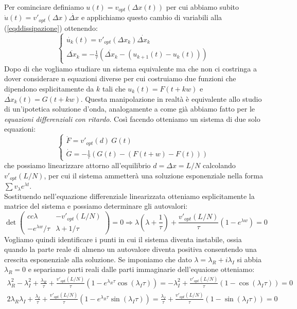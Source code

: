 Per cominciare definiamo $u(t)=v_{opt}(\Delta x(t))$ per cui abbiamo subito $\dot{u}(t)=v'_{opt}(\Delta x)\dot{\Delta x}$ e applichiamo questo cambio di variabili alla (\ref{eqddissipazione}) ottenendo:
\begin{equation}
	\begin{cases}
		\dot{u_k}(t)=v'_{opt}(\Delta x_k)\dot{\Delta x_k}\\
		\ddot{\Delta x_k}=-\frac{1}{\tau}(\dot{\Delta x_k}-(u_{k+1}(t)-u_k(t)))
	\end{cases}
\end{equation}
Dopo di che vogliamo studiare un sistema equivalente ma che non ci costringa a dover considerare n equazioni diverse per cui costruiamo due funzioni che dipendono esplicitamente da $k$ tali che $u_k(t)=F(t+kw)$ e $\dot{\Delta x_k}(t)=G(t+kw)$. Questa manipolazione in realtà è equivalente allo studio di un'ipotetica soluzione d'onda, analogamente a come già abbiamo fatto per le \textit{equazioni differenziali con ritardo}. Così facendo otteniamo un sistema di due solo equazioni:
\begin{equation}
	\begin{cases}
		\dot{F}=v'_{opt}(d)\ G(t)\\
		\dot{G}=-\frac{1}{\tau}(G(t)-(F(t+w)-F(t)))
		\label{fg}
	\end{cases}
\end{equation}
che possiamo linearizzare attorno all'equilibrio $d=\Delta x=L/N$ calcolando $v'_{opt}(L/N)$, per cui il sistema ammetterà una soluzione esponenziale nella forma $\sum v_\lambda e^{\lambda t}$.\\ Sostituendo nell'equazione differenziale linearizzata otteniamo esplicitamente la matrice del sistema e possiamo determinare gli autovalori:
\begin{equation*}
	\det \begin{pmatrix}{cc}
		\lambda & -v'_{opt}(L/N) \\
		-e^{\lambda w}/\tau & \lambda+1/\tau
	\end{pmatrix}=0
	\Rightarrow \lambda(\lambda+\frac{1}{\tau})+\frac{v'_{opt}(L/N)}{\tau}(1-e^{\lambda w})=0
\end{equation*}
Vogliamo quindi identificare i punti in cui il sistema diventa instabile, ossia quando la parte reale di almeno un autovalore diventa positiva consentendo una crescita esponenziale alla soluzione. Se imponiamo che dato $\lambda=\lambda_R+i\lambda_I$ si abbia $\lambda_R=0$ e separiamo parti reali dalle parti immaginarie dell'equaione otteniamo:
\begin{equation*}
	\begin{gathered}
		\lambda_R^2-\lambda_I^2+\frac{\lambda_R}{\tau}+\frac{v'_{opt}(L/N)}{\tau}(1-e^{\lambda_R\tau}\cos(\lambda_I\tau))=-\lambda_I^2+\frac{v'_{opt}(L/N)}{\tau}(1-\cos(\lambda_I\tau))=0\\
		2\lambda_R\lambda_I+\frac{\lambda_I}{\tau}+\frac{v'_{opt}(L/N)}{\tau}(1-e^{\lambda_R\tau}\sin(\lambda_I\tau))=\frac{\lambda_I}{\tau}+\frac{v'_{opt}(L/N)}{\tau}(1-\sin(\lambda_I\tau))=0
	\end{gathered}
\end{equation*}
